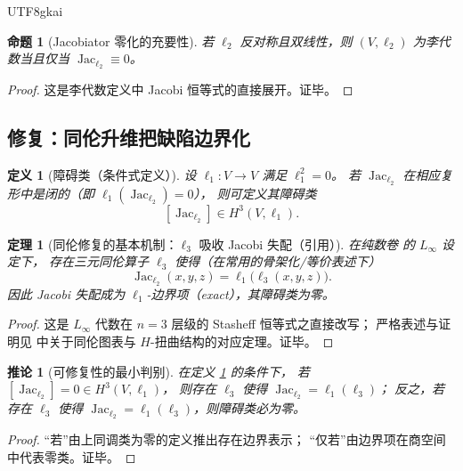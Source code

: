 \documentclass[12pt]{article}
\newtheorem{definition}{定义}[section]
\newtheorem{theorem}{定理}[section]
\newtheorem{proposition}{命题}[section]
\newtheorem{corollary}{推论}[section]
\begin{document}
\begin{CJK*}{UTF8}{gkai}
\begin{proposition}[Jacobiator 零化的充要性]\label{prop:C-lie-iff-jac}
若 $\ell_2$ 反对称且双线性，则 $(V,\ell_2)$ 为李代数当且仅当 $\operatorname{Jac}_{\ell_2}\equiv 0$。
\end{proposition}

\begin{proof}
这是李代数定义中 Jacobi 恒等式的直接展开。证毕。
\end{proof}

\subsection{修复：同伦升维把缺陷边界化}

\begin{definition}[障碍类（条件式定义）]\label{def:C-obstruction-class}
设 $\ell_1:V\to V$ 满足 $\ell_1^2=0$。
若 $\operatorname{Jac}_{\ell_2}$ 在相应复形中是闭的（即 $\ell_1(\operatorname{Jac}_{\ell_2})=0$），
则可定义其障碍类
\[
  [\operatorname{Jac}_{\ell_2}] \in H^3(V,\ell_1).
\]
\end{definition}

\begin{theorem}[同伦修复的基本机制：$\ell_3$ 吸收 Jacobi 失配（引用）]\label{thm:C-l3-absorbs-jac}
在纯数卷 \cite{GaoZheng2025GFramework} 的 $L_\infty$ 设定下，
存在三元同伦算子 $\ell_3$ 使得（在常用的骨架化/等价表述下）
\[
  \operatorname{Jac}_{\ell_2}(x,y,z)=\ell_1\bigl(\ell_3(x,y,z)\bigr).
\]
因此 Jacobi 失配成为 $\ell_1$-边界项（exact），其障碍类为零。
\end{theorem}

\begin{proof}
这是 $L_\infty$ 代数在 $n=3$ 层级的 Stasheff 恒等式之直接改写；
严格表述与证明见 \cite{GaoZheng2025GFramework} 中关于同伦图表与 $H$-扭曲结构的对应定理。证毕。
\end{proof}

\begin{corollary}[可修复性的最小判别]\label{cor:C-repairability-criterion}
在定义 \ref{def:C-obstruction-class} 的条件下，
若 $[\operatorname{Jac}_{\ell_2}]=0\in H^3(V,\ell_1)$，
则存在 $\ell_3$ 使得 $\operatorname{Jac}_{\ell_2}=\ell_1(\ell_3)$；
反之，若存在 $\ell_3$ 使得 $\operatorname{Jac}_{\ell_2}=\ell_1(\ell_3)$，则障碍类必为零。
\end{corollary}

\begin{proof}
“若”由上同调类为零的定义推出存在边界表示；
“仅若”由边界项在商空间中代表零类。证毕。
\end{proof}


\end{CJK*}
\end{document}
